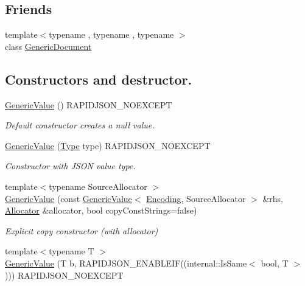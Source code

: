 \subsection*{Friends}
\begin{DoxyCompactItemize}
\item 
{\footnotesize template$<$typename , typename , typename $>$ }\\class \mbox{\hyperlink{classrapidjson_1_1_generic_value_ab05bc9e52e201a2867ea5bac141ee1ae}{Generic\+Document}}
\end{DoxyCompactItemize}
\subsection*{Constructors and destructor.}
\begin{DoxyCompactItemize}
\item 
\mbox{\hyperlink{classrapidjson_1_1_generic_value_ad1f8199e65662e0d52a13a1577d4e4a5}{Generic\+Value}} () R\+A\+P\+I\+D\+J\+S\+O\+N\+\_\+\+N\+O\+E\+X\+C\+E\+PT
\begin{DoxyCompactList}\small\item\em Default constructor creates a null value. \end{DoxyCompactList}\item 
\mbox{\hyperlink{classrapidjson_1_1_generic_value_a646b6d4d3d98799a0926d96ffa127a58}{Generic\+Value}} (\mbox{\hyperlink{namespacerapidjson_ae79a4751c1c460ff0de5ecc07874f3e4}{Type}} type) R\+A\+P\+I\+D\+J\+S\+O\+N\+\_\+\+N\+O\+E\+X\+C\+E\+PT
\begin{DoxyCompactList}\small\item\em Constructor with J\+S\+ON value type. \end{DoxyCompactList}\item 
{\footnotesize template$<$typename Source\+Allocator $>$ }\\\mbox{\hyperlink{classrapidjson_1_1_generic_value_adca019775f68f012643781cd2c2515ac}{Generic\+Value}} (const \mbox{\hyperlink{classrapidjson_1_1_generic_value}{Generic\+Value}}$<$ \mbox{\hyperlink{classrapidjson_1_1_encoding}{Encoding}}, Source\+Allocator $>$ \&rhs, \mbox{\hyperlink{classrapidjson_1_1_allocator}{Allocator}} \&allocator, bool copy\+Const\+Strings=false)
\begin{DoxyCompactList}\small\item\em Explicit copy constructor (with allocator) \end{DoxyCompactList}\item 
{\footnotesize template$<$typename T $>$ }\\\mbox{\hyperlink{classrapidjson_1_1_generic_value_a3573e65eb137267a191a80d9be0fa463}{Generic\+Value}} (T b, R\+A\+P\+I\+D\+J\+S\+O\+N\+\_\+\+E\+N\+A\+B\+L\+E\+IF((internal\+::\+Is\+Same$<$ bool, T $>$))) R\+A\+P\+I\+D\+J\+S\+O\+N\+\_\+\+N\+O\+E\+X\+C\+E\+PT

\end{DoxyCompactItemize}
